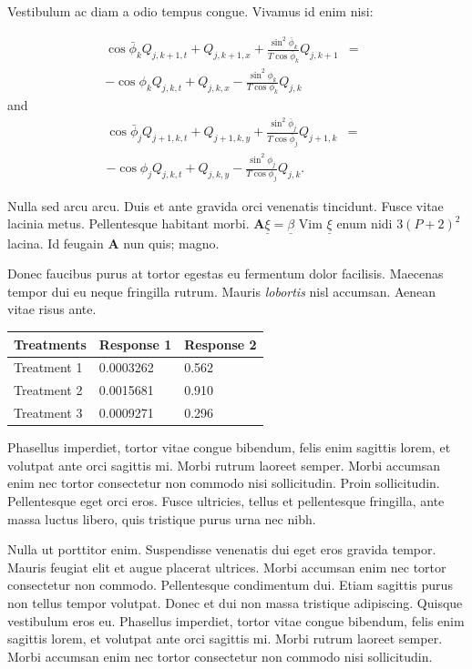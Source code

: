 \documentclass[a0,portrait]{a0poster}
\begin{document}
\begin{multicols}{2}
Vestibulum ac diam a odio tempus congue. Vivamus id enim nisi:

\begin{eqnarray}
\cos\bar{\phi}_k Q_{j,k+1,t} + Q_{j,k+1,x}+\frac{\sin^2\bar{\phi}_k}{T\cos\bar{\phi}_k} Q_{j,k+1} &=&\nonumber\\ 
-\cos\phi_k Q_{j,k,t} + Q_{j,k,x}-\frac{\sin^2\phi_k}{T\cos\phi_k} Q_{j,k}\label{edgek}
\end{eqnarray}
and
\begin{eqnarray}
\cos\bar{\phi}_j Q_{j+1,k,t} + Q_{j+1,k,y}+\frac{\sin^2\bar{\phi}_j}{T\cos\bar{\phi}_j} Q_{j+1,k}&=&\nonumber \\
-\cos\phi_j Q_{j,k,t} + Q_{j,k,y}-\frac{\sin^2\phi_j}{T\cos\phi_j} Q_{j,k}.\label{edgej}
\end{eqnarray} 

Nulla sed arcu arcu. Duis et ante gravida orci venenatis tincidunt. Fusce vitae lacinia metus. Pellentesque habitant morbi. $\mathbf{A}\underline{\xi}=\underline{\beta}$ Vim $\underline{\xi}$ enum nidi $3(P+2)^{2}$ lacina. Id feugain $\mathbf{A}$ nun quis; magno.


Donec faucibus purus at tortor egestas eu fermentum dolor facilisis. Maecenas tempor dui eu neque fringilla rutrum. Mauris \emph{lobortis} nisl accumsan. Aenean vitae risus ante.
%
\begin{table} %
\begin{tabular}{l l l}
\toprule
\textbf{Treatments} & \textbf{Response 1} & \textbf{Response 2}\\
\midrule
Treatment 1 & 0.0003262 & 0.562 \\
Treatment 2 & 0.0015681 & 0.910 \\
Treatment 3 & 0.0009271 & 0.296 \\
\bottomrule
\end{tabular}
\end{table}
%
Phasellus imperdiet, tortor vitae congue bibendum, felis enim sagittis lorem, et volutpat ante orci sagittis mi. Morbi rutrum laoreet semper. Morbi accumsan enim nec tortor consectetur non commodo nisi sollicitudin. Proin sollicitudin. Pellentesque eget orci eros. Fusce ultricies, tellus et pellentesque fringilla, ante massa luctus libero, quis tristique purus urna nec nibh.

Nulla ut porttitor enim. Suspendisse venenatis dui eget eros gravida tempor. Mauris feugiat elit et augue placerat ultrices. Morbi accumsan enim nec tortor consectetur non commodo. Pellentesque condimentum dui. Etiam sagittis purus non tellus tempor volutpat. Donec et dui non massa tristique adipiscing. Quisque vestibulum eros eu. Phasellus imperdiet, tortor vitae congue bibendum, felis enim sagittis lorem, et volutpat ante orci sagittis mi. Morbi rutrum laoreet semper. Morbi accumsan enim nec tortor consectetur non commodo nisi sollicitudin.


\end{multicols}
\end{document}
